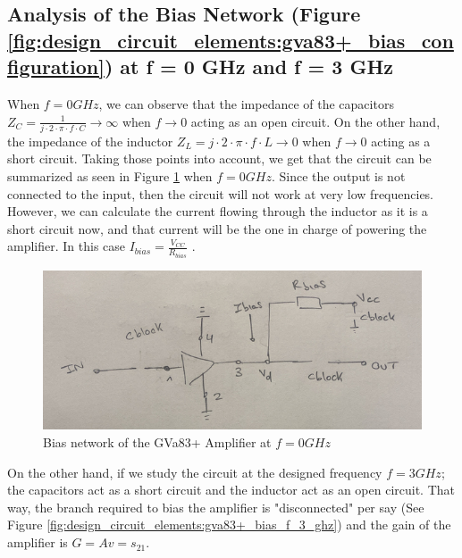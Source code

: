 \documentclass[12pt]{report} %
\begin{document}
\subsection{Analysis of the Bias Network (Figure \ref{fig:design_circuit_elements:gva83+_bias_configuration}) at f = 0 GHz and f = 3 GHz}

When $f = 0 GHz$, we can observe that the impedance of the capacitors $Z_{C} = \frac{1}{j \cdot 2 \cdot \pi \cdot f \cdot C} \xrightarrow{} \infty$ when $f \xrightarrow{} 0$ acting as an open circuit. On the other hand, the impedance of the inductor $Z_{L} = j \cdot 2 \cdot \pi \cdot f \cdot L \xrightarrow{} 0$ when $f \xrightarrow{} 0$ acting as a short circuit. Taking those points into account, we get that the circuit can be summarized as seen in Figure \ref{fig:design_circuit_elements:gva83+_bias_f_0_ghz} when $f = 0 GHz$. Since the output is not connected to the input, then the circuit will not work at very low frequencies. However, we can calculate the current flowing through the inductor as it is a short circuit now, and that current will be the one in charge of powering the amplifier. In this case $I_{bias} = \frac{V_{CC}}{R_{bias}}$ .

\begin{figure}[htbp]
    \centering
    \includegraphics[width=\textwidth]{images/design_circuit_elements/gva83+_bias_f_0_ghz.png}
    \caption{Bias network of the GVa83+ Amplifier at $f = 0 GHz$}
    \label{fig:design_circuit_elements:gva83+_bias_f_0_ghz}
\end{figure}

On the other hand, if we study the circuit at the designed frequency $f = 3 GHz$; the capacitors act as a short circuit and the inductor act as an open circuit. That way, the branch required to bias the amplifier is "disconnected" per say (See Figure \ref{fig:design_circuit_elements:gva83+_bias_f_3_ghz}) and the gain of the amplifier is $G = Av = s_{21}$.
\end{document}
